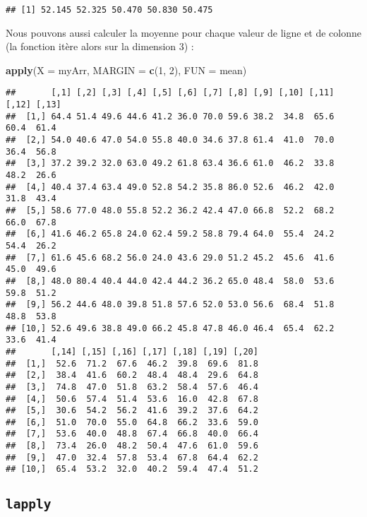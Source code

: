 \documentclass[]{book}
\newenvironment{Shaded}{\begin{snugshade}}{\end{snugshade}}
\newcommand{\KeywordTok}[1]{\textcolor[rgb]{0.13,0.29,0.53}{\textbf{#1}}}
\newcommand{\DataTypeTok}[1]{\textcolor[rgb]{0.13,0.29,0.53}{#1}}
\newcommand{\DecValTok}[1]{\textcolor[rgb]{0.00,0.00,0.81}{#1}}
\newcommand{\NormalTok}[1]{#1}
\theoremstyle{definition}
\theoremstyle{definition}
\theoremstyle{definition}
\theoremstyle{remark}
\begin{document}
\begin{verbatim}
## [1] 52.145 52.325 50.470 50.830 50.475
\end{verbatim}

Nous pouvons aussi calculer la moyenne pour chaque valeur de ligne et de
colonne (la fonction itère alors sur la dimension 3) :

\begin{Shaded}
\begin{Highlighting}[]
\KeywordTok{apply}\NormalTok{(}\DataTypeTok{X =}\NormalTok{ myArr, }\DataTypeTok{MARGIN =} \KeywordTok{c}\NormalTok{(}\DecValTok{1}\NormalTok{, }\DecValTok{2}\NormalTok{), }\DataTypeTok{FUN =}\NormalTok{ mean)}
\end{Highlighting}
\end{Shaded}

\begin{verbatim}
##       [,1] [,2] [,3] [,4] [,5] [,6] [,7] [,8] [,9] [,10] [,11] [,12] [,13]
##  [1,] 64.4 51.4 49.6 44.6 41.2 36.0 70.0 59.6 38.2  34.8  65.6  60.4  61.4
##  [2,] 54.0 40.6 47.0 54.0 55.8 40.0 34.6 37.8 61.4  41.0  70.0  36.4  56.8
##  [3,] 37.2 39.2 32.0 63.0 49.2 61.8 63.4 36.6 61.0  46.2  33.8  48.2  26.6
##  [4,] 40.4 37.4 63.4 49.0 52.8 54.2 35.8 86.0 52.6  46.2  42.0  31.8  43.4
##  [5,] 58.6 77.0 48.0 55.8 52.2 36.2 42.4 47.0 66.8  52.2  68.2  66.0  67.8
##  [6,] 41.6 46.2 65.8 24.0 62.4 59.2 58.8 79.4 64.0  55.4  24.2  54.4  26.2
##  [7,] 61.6 45.6 68.2 56.0 24.0 43.6 29.0 51.2 45.2  45.6  41.6  45.0  49.6
##  [8,] 48.0 80.4 40.4 44.0 42.4 44.2 36.2 65.0 48.4  58.0  53.6  59.8  51.2
##  [9,] 56.2 44.6 48.0 39.8 51.8 57.6 52.0 53.0 56.6  68.4  51.8  48.8  53.8
## [10,] 52.6 49.6 38.8 49.0 66.2 45.8 47.8 46.0 46.4  65.4  62.2  33.6  41.4
##       [,14] [,15] [,16] [,17] [,18] [,19] [,20]
##  [1,]  52.6  71.2  67.6  46.2  39.8  69.6  81.8
##  [2,]  38.4  41.6  60.2  48.4  48.4  29.6  64.8
##  [3,]  74.8  47.0  51.8  63.2  58.4  57.6  46.4
##  [4,]  50.6  57.4  51.4  53.6  16.0  42.8  67.8
##  [5,]  30.6  54.2  56.2  41.6  39.2  37.6  64.2
##  [6,]  51.0  70.0  55.0  64.8  66.2  33.6  59.0
##  [7,]  53.6  40.0  48.8  67.4  66.8  40.0  66.4
##  [8,]  73.4  26.0  48.2  50.4  47.6  61.0  59.6
##  [9,]  47.0  32.4  57.8  53.4  67.8  64.4  62.2
## [10,]  65.4  53.2  32.0  40.2  59.4  47.4  51.2
\end{verbatim}

\subsection{\texorpdfstring{\texttt{lapply}}{lapply}}\label{l17sapply}
\end{document}
